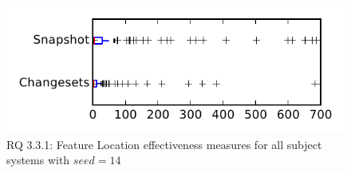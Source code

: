 
\begin{figure}
\centering
\includegraphics[height=0.4\textheight]{figures/flt_seed/rq1_tiny_14}
\caption{RQ 3.3.1: Feature Location effectiveness measures for all subject systems with $seed=14$}
\label{fig:flt_seed:rq1:tiny}
\end{figure}
